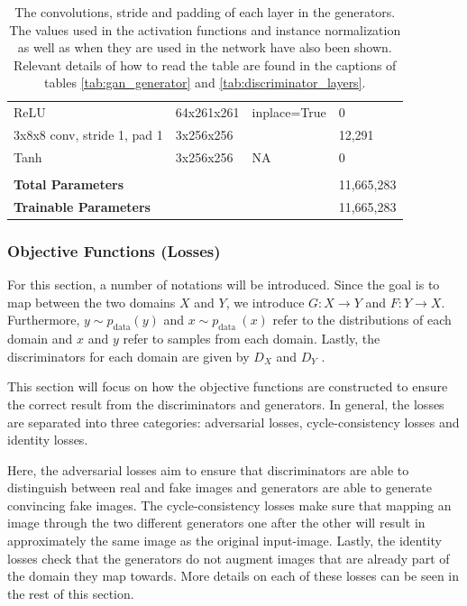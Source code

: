 \documentclass[12pt, fleqn, titlepage]{article}
\begin{document}
\begin{table}[H]
\begin{tabular}{llll}
		ReLU                                        & 64x261x261     & inplace=True& 0             \\
		3x8x8 conv, stride 1, pad 1                 & 3x256x256      &             & 12,291        \\
		Tanh                                        & 3x256x256      & NA          & 0             \\
		                                            &                &             &               \\
		\textbf{Total Parameters}                   &                &             & 11,665,283    \\
		\textbf{Trainable Parameters}               &                &             & 11,665,283    \\ \bottomrule
	\end{tabular}
	\caption{The convolutions, stride and padding of each layer in the generators. The values used in the activation functions and instance normalization as well as when they are used in the network have also been shown. Relevant details of how to read the table are found in the captions of tables \ref{tab:gan_generator} and \ref{tab:discriminator_layers}.}
	\label{tab:generator_layers}
\end{table}

\subsubsection{Objective Functions (Losses)}
For this section, a number of notations will be introduced. Since the goal is to map between the two domains $X$ and $Y$, we introduce $G : X \rightarrow Y$ and $F : Y \rightarrow X$. Furthermore, $y \sim p_{\text {data}}(y)$ and $x \sim p_{\text {data }}(x)$ refer to the distributions of each domain and $x$ and $y$ refer to samples from each domain. Lastly, the discriminators for each domain are given by $D_X$ and $D_Y$ \cite{original_cyclegan}.

This section will focus on how the objective functions are constructed to ensure the correct result from the discriminators and generators. In general, the losses are separated into three categories: adversarial losses, cycle-consistency losses and identity losses. 

Here, the adversarial losses aim to ensure that discriminators are able to distinguish between real and fake images and generators are able to generate convincing fake images. The cycle-consistency losses make sure that mapping an image through the two different generators one after the other will result in approximately the same image as the original input-image. Lastly, the identity losses check that the generators do not augment images that are already part of the domain they map towards. More details on each of these losses can be seen in the rest of this section.
\end{document}
